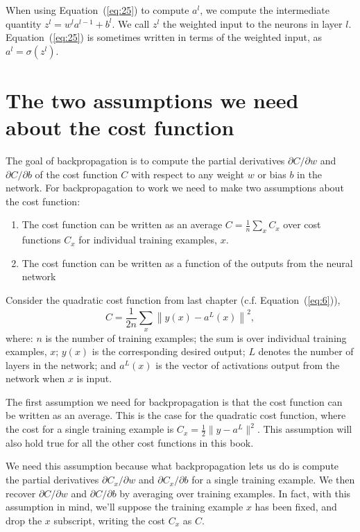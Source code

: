 \documentclass[a4paper,twoside,10pt]{book}
\begin{document}
When using Equation~(\ref{eq:25}) to compute $a^l$, we compute the intermediate quantity $z^l = w^l a^{l-1}+b^l$. We call $z^l$ the weighted input to the neurons in layer $l$. Equation~(\ref{eq:25}) is sometimes written in terms of the weighted input, as $a^l=\sigma(z^l)$.

\section{The two assumptions we need about the cost function}
The goal of backpropagation is to compute the partial derivatives $\partial{}C/\partial{}w$ and $\partial{}C/\partial{}b$ of the cost function $C$ with respect to any weight $w$ or bias $b$ in the network. For backpropagation to work we need to make two assumptions about the cost function:
\begin{enumerate}
  \item The cost function can be written as an average $C=\frac1n\sum_xC_x$ over cost functions $C_x$ for individual training examples, $x$. %
  \item The cost function can be written as a function of the outputs from the neural network
\end{enumerate}


Consider the quadratic cost function from last chapter (c.f. Equation~(\ref{eq:6})),
\begin{equation}
C = \frac{1}{2n} \sum_x \left\|y(x)-a^L(x)\right\|^2,
\tag{26}\label{eq:26}
\end{equation}
where: $n$ is the number of training examples; the sum is over individual training examples, $x$; $y(x)$ is the corresponding desired output; $L$ denotes the number of layers in the network; and $a^L(x)$ is the vector of activations output from the network when $x$ is input.

The first assumption we need for backpropagation is that the cost function can be written as an average. This is the case for the quadratic cost function, where the cost for a single training example is $C_x=\frac12\|y-a^L\|^2$. This assumption will also hold true for all the other cost functions in this book.

We need this assumption because what backpropagation lets us do is compute the partial derivatives $\partial{}C_x/\partial{}w$ and $\partial{}C_x/\partial{}b$ for a single training example. We then recover $\partial{}C/\partial{}w$ and $\partial{}C/\partial{}b$ by averaging over training examples. In fact, with this assumption in mind, we'll suppose the training example $x$ has been fixed, and drop the $x$ subscript, writing the cost $C_x$ as $C$. %
\end{document}
